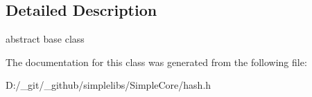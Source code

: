 \subsection{Detailed Description}
abstract base class 

The documentation for this class was generated from the following file\+:\begin{DoxyCompactItemize}
\item 
D\+:/\+\_\+git/\+\_\+github/simplelibs/\+Simple\+Core/hash.\+h\end{DoxyCompactItemize}
